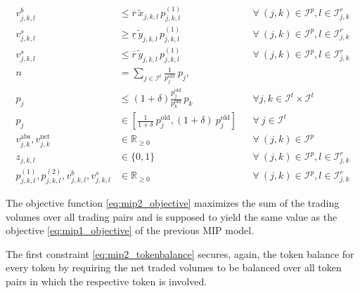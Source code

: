 \documentclass[11pt,parskip=full]{scrartcl}%
\newcommand*{\itokens}{\mathcal{I}^t}       %
\newcommand*{\itokenpairs}{\mathcal{I}^p}   %
\begin{document}
\begin{small}
\begin{subequations}
\begin{align}
  \label{eq:mip2_buyvolume_lb}
  \\[0mm]
  v^b_{j,k,l}
  &\le \overline{r} \, \tilde{x}_{j,k,l} \, p^{(1)}_{j,k,l}
  && \forall \> (j,k) \in \itokenpairs, l \in \mathcal{I}_{j,k}^r
  \label{eq:mip2_buyvolume_ub}
  \\[0mm]
  v^s_{j,k,l}
  &\ge \underline{r} \, \tilde{y}_{j,k,l} \, p^{(1)}_{j,k,l}
  && \forall \> (j,k) \in \itokenpairs, l \in \mathcal{I}_{j,k}^r
  \label{eq:mip2_sellvolume_lb}
  \\[0mm]
  v^s_{j,k,l}
  &\le \overline{r} \, \tilde{y}_{j,k,l} \, p^{(1)}_{j,k,l}
  && \forall \> (j,k) \in \itokenpairs, l \in \mathcal{I}_{j,k}^r
  \label{eq:mip2_sellvolume_ub}
  \\[1mm]
  n
  &= \sum\limits_{j \in \itokens} \frac{1}{p^\mathrm{old}_j} \> p_j,
  \label{eq:mip2_reftoken}
  \\[1mm]
  p_j
  &\le \left(1+\delta\right) \frac{p^\mathrm{old}_j}{p^\mathrm{old}_k} \, p_k
  && \forall j,k \in \itokens \times \itokens
  \label{eq:mip2_maxfluct}
  \\[1mm]
  p_j
  &\in \left[ \frac{1}{1+\delta} \> p^\mathrm{old}_j, (1+\delta) \> p^\mathrm{old}_j \right]
  && \forall \> j \in \itokens
  \\[1mm]
  v_{j,k}^\mathrm{abs}, v_{j,k}^\mathrm{net}
  &\in \mathbb{R}_{\ge 0}
  && \forall \> (j,k) \in \itokenpairs
  \\[1mm]
  z_{j,k,l}
  &\in \{0,1\}
  && \forall \> (j,k) \in \itokenpairs, l \in \mathcal{I}_{j,k}^r
  \\[1mm]
  p^{(1)}_{j,k,l}, p^{(2)}_{j,k,l}, v^b_{j,k,l}, v^s_{j,k,l}
  &\in \mathbb{R}_{\ge 0}
  && \forall \> (j,k) \in \itokenpairs, l \in \mathcal{I}_{j,k}^r
\end{align}
\label{eq:mip2}
\end{subequations}
\end{small}

The objective function \eqref{eq:mip2_objective} maximizes the sum of the trading volumes over all
trading pairs and is supposed to yield the same value as the objective \eqref{eq:mip1_objective} of
the previous MIP model.

The first constraint \eqref{eq:mip2_tokenbalance} secures, again, the token balance for every token
by requiring the net traded volumes to be balanced over all token pairs in which the respective
token is involved.
\end{document}
